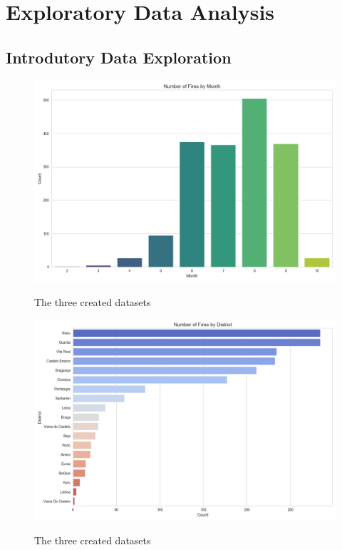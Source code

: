 \chapter{Exploratory Data Analysis}
\label{sec:eda}

\section{Introdutory Data Exploration}




\begin{figure}[H]
	\caption{The three created datasets}
	\centering
	\includegraphics[width=\textwidth]{chapter-images/5_1-eda/monthly_fire_count.png}
	\label{fig:montly_fire_count}
\end{figure}



\begin{figure}[H]
	\caption{The three created datasets}
	\centering
	\includegraphics[width=\textwidth]{chapter-images/5_1-eda/district_fire_count.png}
	\label{fig:montly_fire_count}
\end{figure}


